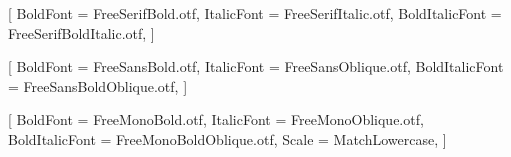 \usepackage{fontspec}

\setmainfont{FreeSerif.otf}[
  BoldFont       = FreeSerifBold.otf,
  ItalicFont     = FreeSerifItalic.otf,
  BoldItalicFont = FreeSerifBoldItalic.otf,
]

\setsansfont{FreeSans.otf}[
  BoldFont       = FreeSansBold.otf,
  ItalicFont     = FreeSansOblique.otf,
  BoldItalicFont = FreeSansBoldOblique.otf,
]

\setmonofont{FreeMono.otf}[
  BoldFont       = FreeMonoBold.otf,
  ItalicFont     = FreeMonoOblique.otf,
  BoldItalicFont = FreeMonoBoldOblique.otf,
  Scale          = MatchLowercase,
]
